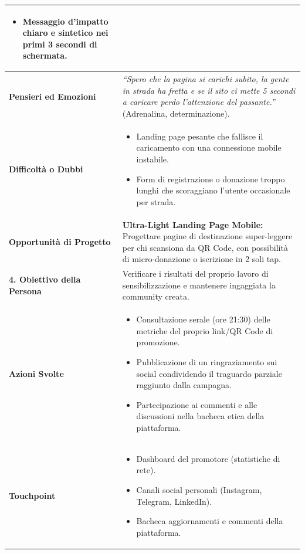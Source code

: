 \documentclass[11pt,a4paper]{article}
\begin{document}
\begin{table}[h!]
\begin{tabular}{|p{3.2cm}|p{11.8cm}|}
\begin{itemize}[leftmargin=*,nosep]
    \item Messaggio d'impatto chiaro e sintetico nei primi 3 secondi di schermata.
\end{itemize} \\ \hline
\textbf{Pensieri ed Emozioni} &
\textit{``Spero che la pagina si carichi subito, la gente in strada ha fretta e se il sito ci mette 5 secondi a caricare perdo l'attenzione del passante.''} (Adrenalina, determinazione). \\ \hline
\textbf{Difficoltà o Dubbi} &
\begin{itemize}[leftmargin=*,nosep]
    \item Landing page pesante che fallisce il caricamento con una connessione mobile instabile.
    \item Form di registrazione o donazione troppo lunghi che scoraggiano l'utente occasionale per strada.
\end{itemize} \\ \hline
\textbf{Opportunità di Progetto} &
\textbf{Ultra-Light Landing Page Mobile:} Progettare pagine di destinazione super-leggere per chi scansiona da QR Code, con possibilità di micro-donazione o iscrizione in 2 soli tap. \\ \hline
\hline
\textbf{4. Obiettivo della Persona} & Verificare i risultati del proprio lavoro di sensibilizzazione e mantenere ingaggiata la community creata. \\ \hline
\textbf{Azioni Svolte} &
\begin{itemize}[leftmargin=*,nosep]
    \item Consultazione serale (ore 21:30) delle metriche del proprio link/QR Code di promozione.
    \item Pubblicazione di un ringraziamento sui social condividendo il traguardo parziale raggiunto dalla campagna.
    \item Partecipazione ai commenti e alle discussioni nella bacheca etica della piattaforma.
\end{itemize} \\ \hline
\textbf{Touchpoint} &
\begin{itemize}[leftmargin=*,nosep]
    \item Dashboard del promotore (statistiche di rete).
    \item Canali social personali (Instagram, Telegram, LinkedIn).
    \item Bacheca aggiornamenti e commenti della piattaforma.
\end{itemize} \\ \hline

\end{tabular}
\end{table}
\end{document}
